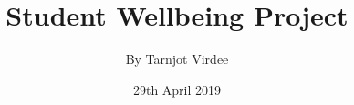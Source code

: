 \documentclass[a4paper, 12pt]{article}
\begin{document}
\title{\Large{\textbf{Student Wellbeing Project}}}
\author{By Tarnjot Virdee}
\date{29th April 2019}

\maketitle

\newpage









\end{document}
